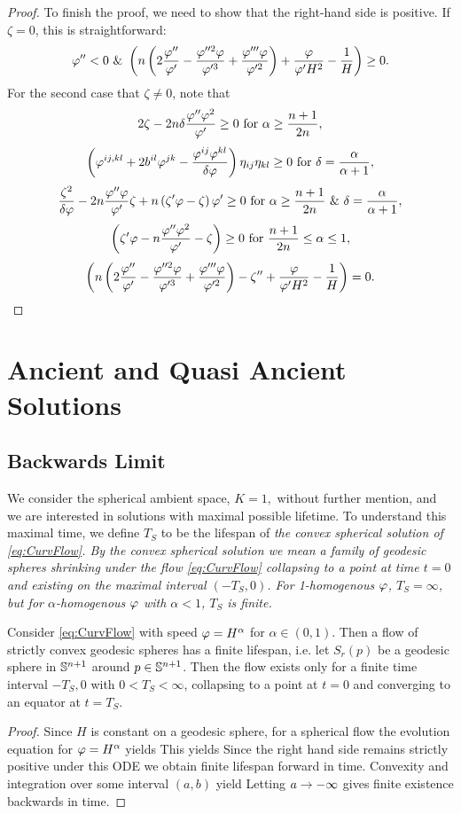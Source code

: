 \documentclass{amsart}
\begin{document}
\begin{proof}
To finish the proof, we need to show that the right-hand side is positive. If $\zeta=0$, this is straightforward:
\[\varphi''<0~\&~\br{n\br{2\fr{\p''}{\p'}-\fr{\p''^{2}\p}{\p'^{3}}+\fr{\p'''\p}{\p'^{2}}}+\fr{\p}{\p'H^2}-\fr{1}{H}}\geq 0.\]
For the second case that $\zeta\neq 0$, note that
$$2\zeta-2n\d\fr{\p''\p^2}{\p'}\geq 0~\mbox{for}~\alpha\geq \frac{n+1}{2n},$$
$$\br{\p^{ij,kl}+2b^{il}\p^{jk}-\fr{\p^{ij}\p^{kl}}{\d\p}}\eta_{ij}\eta_{kl}\geq0~\mbox{for}~\delta=\frac{\alpha}{\alpha+1},$$
$$\fr{\zeta^2}{\d\p}-2n\fr{\p''\p}{\p'}\zeta+n\br{\zeta'\p-\zeta}\p'\geq 0~\mbox{for}~\alpha\geq\frac{n+1}{2n}~\&~\delta=\frac{\alpha}{\alpha+1},$$
$$\br{\zeta'\p-n\fr{\p''\p^2}{\p'}-\zeta}\geq 0~\mbox{for}~\frac{n+1}{2n}\leq \alpha\leq 1,$$
$$\br{n\br{2\fr{\p''}{\p'}-\fr{\p''^{2}\p}{\p'^{3}}+\fr{\p'''\p}{\p'^{2}}}-\zeta''+\fr{\p}{\p'H^2}-\fr{1}{H}}=0.$$
\end{proof}

\section{Ancient and Quasi Ancient Solutions}

\subsection{Backwards Limit}
We consider the spherical ambient space, $K=1,$ without further mention, and we are interested in solutions with maximal possible lifetime. To understand this maximal time, we define $T_S$ to be the lifespan of \it{the} convex spherical solution of \eqref{eq:CurvFlow}. By the convex spherical solution we mean a family of geodesic spheres shrinking under the flow \eqref{eq:CurvFlow} collapsing to a point at time $t=0$ and existing on the maximal interval \((-T_S, 0)\). For 1-homogenous $\p$, \(T_S = \infty\), but for $\alpha$-homogenous $\p$ with $\alpha<1$, \(T_S\) is finite.

\begin{lemma}
 Consider \eqref{eq:CurvFlow} with speed \(\p = H^{\alpha}\) for \(\alpha \in (0,1)\). Then a flow of strictly convex geodesic spheres has a finite lifespan, i.e. let $S_r(p)$ be a geodesic sphere in $\S^{n+1}$ around $p\in \S^{n+1}$. Then the flow exists only for a finite time interval \(-T_S,0\) with \(0 < T_S < \infty\), collapsing to a point at \(t=0\) and converging to an equator at \(t=T_S\).
\end{lemma}

\begin{proof}
Since $H$ is constant on a geodesic sphere, for a spherical flow the evolution equation for $\p=H^{\a}$ yields
This yields
Since the right hand side remains strictly positive under this ODE we obtain finite lifespan forward in time.
Convexity and integration over some interval $(a,b)$ yield
Letting $a\ra-\8$ gives finite existence backwards in time.
\end{proof}
\end{document}
